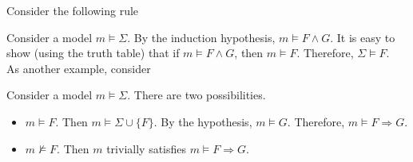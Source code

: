 Consider the following rule
\begin{prooftree}
\end{prooftree}
Consider a model $m\vDash\Sigma$. By the induction hypothesis, $m\vDash F\wedge G$. It is easy to show (using the truth table) that if $m\vDash F\wedge G$, then $m\vDash F$. Therefore, $\Sigma\vDash F$.\\

As another example, consider
\begin{prooftree}
\end{prooftree}
Consider a model $m\vDash\Sigma$. There are two possibilities.
\begin{itemize}
    \item $m\vDash F$. Then $m\vDash \Sigma\cup\{F\}$. By the hypothesis, $m\vDash G$. Therefore, $m\vDash F\Rightarrow G$.
    \item $m\nvDash F$. Then $m$ trivially satisfies $m\vDash F\Rightarrow G$.
\end{itemize}